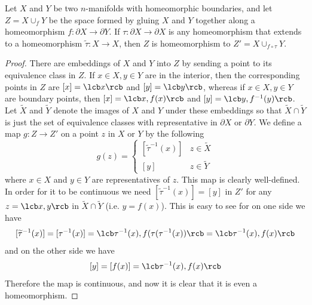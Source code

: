 \begin{lem}
\label{technical gluing lemma}
Let $X$ and $Y$ be two $n$-manifolds with homeomorphic boundaries, and let $Z = X \cup_f Y$ be the space formed by gluing $X$ and $Y$ together along a homeomorphism $f : \partial X \rightarrow \partial Y$. If $\tau : \partial X \rightarrow \partial X$ is any homeomorphism that extends to a homeomorphism $\widetilde \tau : X \rightarrow X$, then $Z$ is homeomorphism to $Z' = X \cup_{f \circ \tau} Y$.
\end{lem}
\begin{proof}
There are embeddings of $X$ and $Y$ into $Z$ by sending a point to its equivalence class in $Z$. If $x \in X,y \in Y$ are in the interior, then the corresponding points in $Z$ are $[x]=\lcb x \rcb$ and $[y]=\lcb y \rcb$, whereas if $x \in X,y \in Y$ are boundary points, then $[x]=\lcb x,f(x) \rcb$ and $[y] = \lcb y,f^{-1}(y) \rcb$. Let $\widetilde X$ and $\widetilde Y$ denote the images of $X$ and $Y$ under these embeddings so that $\widetilde X \cap \widetilde Y$ is just the set of equivalence classes with representative in $\partial X$ or $\partial Y$. We define a map $g : Z \rightarrow Z'$ on a point $z$ in $X$ or $Y$ by the following
\[ g(z) = \begin{cases}
				[\widetilde \tau^{-1}(x)] & z \in \widetilde X \\
				[y] & z \in \widetilde Y
			\end{cases}
\]
where $x \in X$ and $y \in Y$ are representatives of $z$. This map is clearly well-defined. In order for it to be continuous we need $[\widetilde \tau^{-1}(x)] = [y]$ in $Z'$ for any $z=\lcb x,y \rcb$ in $\widetilde X \cap \widetilde Y$ (i.e. $y=f(x)$). This is easy to see for on one side we have
\[ [\widetilde \tau^{-1}(x)] = [\tau^{-1}(x)] = \lcb \tau^{-1}(x),f(\tau(\tau^{-1}(x)) \rcb = \lcb \tau^{-1}(x),f(x) \rcb \]
and on the other side we have
\[ [y] = [f(x)] = \lcb \tau^{-1}(x),f(x) \rcb \]
Therefore the map is continuous, and now it is clear that it is even a homeomorphism.
\end{proof}

